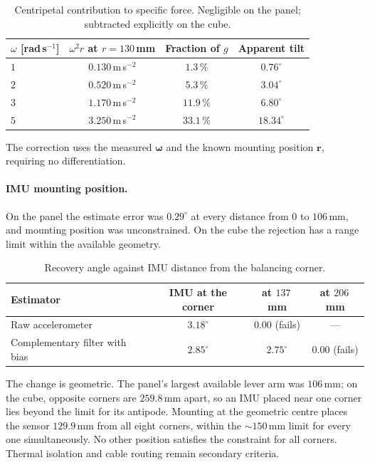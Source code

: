 \begin{table}[htbp]
\centering
\small
\begin{tabular}{@{}lccc@{}}
\toprule
$\omega$ [rad\,s$^{-1}$] & $\omega^2 r$ at $r = 130$\,mm & Fraction of $g$ & Apparent tilt\\
\midrule
$1$ & $0.130$\,m\,s$^{-2}$ & $1.3\,\%$ & $0.76^\circ$\\
$2$ & $0.520$\,m\,s$^{-2}$ & $5.3\,\%$ & $3.04^\circ$\\
$3$ & $1.170$\,m\,s$^{-2}$ & $11.9\,\%$ & $6.80^\circ$\\
$5$ & $3.250$\,m\,s$^{-2}$ & $33.1\,\%$ & $18.34^\circ$\\
\bottomrule
\end{tabular}
\caption{Centripetal contribution to specific force. Negligible on the panel;
subtracted explicitly on the cube.}
\label{tab:centripetal}
\end{table}

The correction uses the measured $\bm{\omega}$ and the known mounting
position $\bm{r}$, requiring no differentiation.

\paragraph{IMU mounting position.} On the panel the estimate error was
$0.29^\circ$ at every distance from $0$ to $106$\,mm, and mounting position
was unconstrained. On the cube the rejection has a range limit within the
available geometry.

\begin{table}[htbp]
\centering
\small
\begin{tabular}{@{}lccc@{}}
\toprule
\textbf{Estimator} & \textbf{IMU at the corner} & \textbf{at $137$\,mm} & \textbf{at $206$\,mm}\\
\midrule
Raw accelerometer & $3.18^\circ$ & $0.00$ (fails) & ---\\
Complementary filter with bias & $2.85^\circ$ & $2.75^\circ$ & $0.00$ (fails)\\
\bottomrule
\end{tabular}
\caption{Recovery angle against IMU distance from the balancing corner.}
\label{tab:imu-placement}
\end{table}

The change is geometric. The panel's largest available lever arm was
$106$\,mm; on the cube, opposite corners are $259.8$\,mm apart, so an IMU
placed near one corner lies beyond the limit for its antipode. Mounting at
the geometric centre places the sensor $129.9$\,mm from all eight corners,
within the ${\sim}150$\,mm limit for every one simultaneously. No other
position satisfies the constraint for all corners. Thermal isolation and
cable routing remain secondary criteria.

